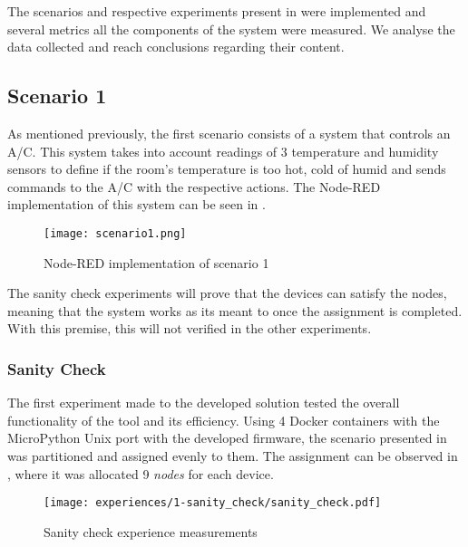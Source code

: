 The scenarios and respective experiments present in  were implemented and several metrics all the components of the system were measured. We analyse the data collected and reach conclusions regarding their content.

\subsection{Scenario 1}\label{sec:discussion_scenario1}

As mentioned previously, the first scenario consists of a system that controls an A/C. This system takes into account readings of 3 temperature and humidity sensors to define if the room's temperature is too hot, cold of humid and sends commands to the A/C with the respective actions. The Node-RED implementation of this system can be seen in .

\begin{figure}[h]
\centering
\texttt{[image: scenario1.png]}
\caption[Node-RED implementation of scenario 1]{Node-RED implementation of scenario 1}\label{fig:scenario1_node_red}
\end{figure}

The sanity check experiments will prove that the devices can satisfy the nodes, meaning that the system works as its meant to once the assignment is completed. With this premise, this will not verified in the other experiments.


\subsubsection{Sanity Check}\label{sec:sanity_check_exp}

The first experiment made to the developed solution tested the overall functionality of the tool and its efficiency. Using 4 Docker containers with the MicroPython Unix port with the developed firmware, the scenario presented in  was partitioned and assigned evenly to them. The assignment can be observed in , where it was allocated 9 \textit{nodes} for each device.

\begin{figure}[h]
\centering
\texttt{[image: experiences/1-sanity\_check/sanity\_check.pdf]}
\caption[Sanity check experience measurements]{Sanity check experience measurements}\label{fig:sanity_check_graph}
\end{figure}

